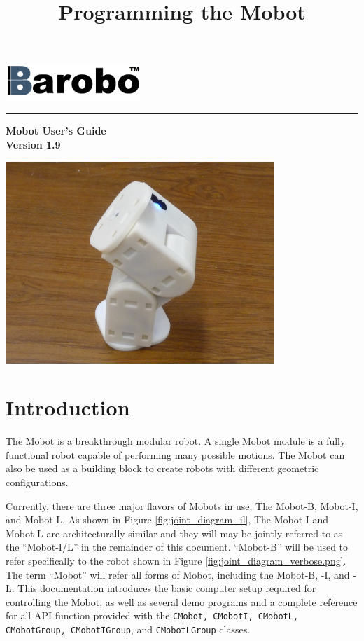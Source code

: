 \documentclass{article}
\title{Programming the Mobot}
\begin{document}
\includegraphics[width=2in]{images/Barobo.png}
\hrule
\begin{center}
\vspace*{2.5cm}
{\Huge\sf\bf Mobot User's Guide}\\
\vspace*{2.5cm}
{\Large\bf Version 1.9}
\vspace{4.5cm}

\includegraphics[width=4in]{images/Mobot_Camera_Stand.JPG}
\end{center}


\newpage
\tableofcontents
\newpage
\section{Introduction}
The Mobot is a breakthrough modular robot. A single Mobot module is a fully 
functional robot capable of performing many possible motions. The Mobot
can also be used as a building block to create robots with different
geometric configurations. 

Currently, there are three major flavors of Mobots in use; The Mobot-B, Mobot-I, and
Mobot-L. As shown in Figure \ref{fig:joint_diagram_il}, 
  The Mobot-I and Mobot-L are architecturally similar and they will may 
be jointly referred to as the ``Mobot-I/L'' in the remainder of this document. 
``Mobot-B'' will be used to refer specifically to the robot shown in
Figure \ref{fig:joint_diagram_verbose.png}. The term ``Mobot'' will refer all
forms of Mobot, including the Mobot-B, -I, and -L. 
This documentation introduces the basic computer setup required for controlling 
the Mobot, as well as several demo programs and a complete reference for all
API function provided with the \texttt{CMobot, CMobotI, CMobotL, CMobotGroup,
  CMobotIGroup}, and \texttt{CMobotLGroup} classes.
\end{document}
